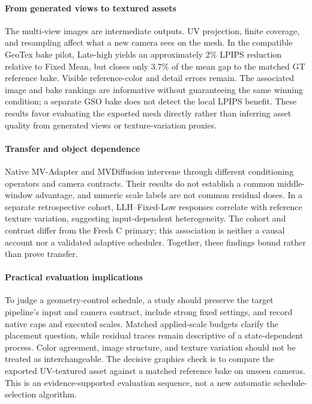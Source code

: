 \documentclass[times,twocolumn,final]{elsarticle}
\begin{document}
\paragraph{From generated views to textured assets}
The multi-view images are intermediate outputs. UV projection, finite coverage, and resampling affect what a new camera sees on the mesh. In the compatible GeoTex bake pilot, Late-high yields an approximately 2\% LPIPS reduction relative to Fixed Mean, but closes only 3.7\% of the mean gap to the matched GT reference bake. Visible reference-color and detail errors remain. The associated image and bake rankings are informative without guaranteeing the same winning condition; a separate GSO bake does not detect the local LPIPS benefit. These results favor evaluating the exported mesh directly rather than inferring asset quality from generated views or texture-variation proxies.

\paragraph{Transfer and object dependence}
Native MV-Adapter and MVDiffusion intervene through different conditioning operators and camera contracts. Their results do not establish a common middle-window advantage, and numeric scale labels are not common residual doses. In a separate retrospective cohort, LLH--Fixed-Low responses correlate with reference texture variation, suggesting input-dependent heterogeneity. The cohort and contrast differ from the Fresh C primary; this association is neither a causal account nor a validated adaptive scheduler. Together, these findings bound rather than prove transfer.

\paragraph{Practical evaluation implications}
To judge a geometry-control schedule, a study should preserve the target pipeline's input and camera contract, include strong fixed settings, and record native caps and executed scales. Matched applied-scale budgets clarify the placement question, while residual traces remain descriptive of a state-dependent process. Color agreement, image structure, and texture variation should not be treated as interchangeable. The decisive graphics check is to compare the exported UV-textured asset against a matched reference bake on unseen cameras. This is an evidence-supported evaluation sequence, not a new automatic schedule-selection algorithm.
\end{document}
